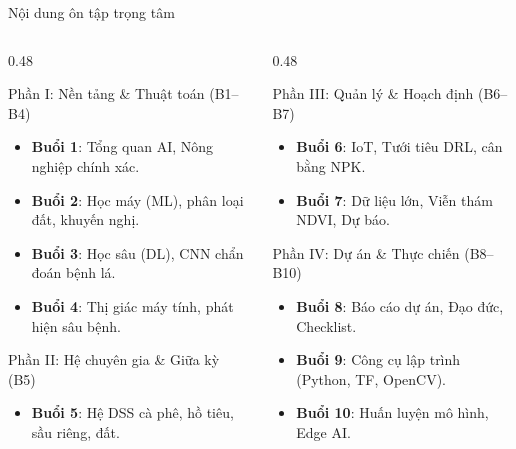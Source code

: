 \documentclass[aspectratio=169,10pt]{beamer}
\begin{document}
\begin{frame}{Nội dung ôn tập trọng tâm}
    \begin{columns}[t]
        \begin{column}{0.48\textwidth}
            \begin{block}{Phần I: Nền tảng \& Thuật toán (B1--B4)}
                \begin{itemize}
                    \item \textbf{Buổi 1}: Tổng quan AI, Nông nghiệp chính xác.
                    \item \textbf{Buổi 2}: Học máy (ML), phân loại đất, khuyến nghị.
                    \item \textbf{Buổi 3}: Học sâu (DL), CNN chẩn đoán bệnh lá.
                    \item \textbf{Buổi 4}: Thị giác máy tính, phát hiện sâu bệnh.
                \end{itemize}
            \end{block}
            \begin{block}{Phần II: Hệ chuyên gia \& Giữa kỳ (B5)}
                \begin{itemize}
                    \item \textbf{Buổi 5}: Hệ DSS cà phê, hồ tiêu, sầu riêng, đất.
                \end{itemize}
            \end{block}
        \end{column}
        \begin{column}{0.48\textwidth}
            \begin{block}{Phần III: Quản lý \& Hoạch định (B6--B7)}
                \begin{itemize}
                    \item \textbf{Buổi 6}: IoT, Tưới tiêu DRL, cân bằng NPK.
                    \item \textbf{Buổi 7}: Dữ liệu lớn, Viễn thám NDVI, Dự báo.
                \end{itemize}
            \end{block}
            \begin{block}{Phần IV: Dự án \& Thực chiến (B8--B10)}
                \begin{itemize}
                    \item \textbf{Buổi 8}: Báo cáo dự án, Đạo đức, Checklist.
                    \item \textbf{Buổi 9}: Công cụ lập trình (Python, TF, OpenCV).
                    \item \textbf{Buổi 10}: Huấn luyện mô hình, Edge AI.
                \end{itemize}
            \end{block}
        \end{column}
    \end{columns}
\end{frame}
\end{document}
